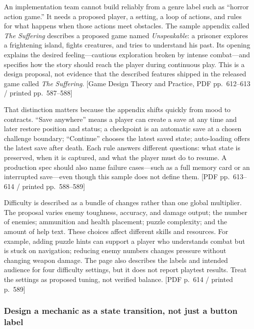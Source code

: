 \hypertarget{05-engine-i-ch009-a-design-document-describes-a-game-that-is-meant-to-exist}{}

An implementation team cannot build reliably from a genre label such as ``horror action game.'' It needs a proposed player, a setting, a loop of actions, and rules for what happens when those actions meet obstacles. The sample appendix called \emph{The Suffering} describes a proposed game named \emph{Unspeakable}: a prisoner explores a frightening island, fights creatures, and tries to understand his past. Its opening explains the desired feeling---cautious exploration broken by intense combat---and specifies how the story should reach the player during continuous play. This is a design proposal, not evidence that the described features shipped in the released game called \emph{The Suffering}. {[}Game Design Theory and Practice, PDF pp.~612--613 / printed pp.~587--588{]}

That distinction matters because the appendix shifts quickly from mood to contracts. ``Save anywhere'' means a player can create a save at any time and later restore position and status; a checkpoint is an automatic save at a chosen challenge boundary; ``Continue'' chooses the latest saved state; auto-loading offers the latest save after death. Each rule answers different questions: what state is preserved, when it is captured, and what the player must do to resume. A production spec should also name failure cases---such as a full memory card or an interrupted save---even though this sample does not define them. {[}PDF pp.~613--614 / printed pp.~588--589{]}

Difficulty is described as a bundle of changes rather than one global multiplier. The proposal varies enemy toughness, accuracy, and damage output; the number of enemies; ammunition and health placement; puzzle complexity; and the amount of help text. These choices affect different skills and resources. For example, adding puzzle hints can support a player who understands combat but is stuck on navigation; reducing enemy numbers changes pressure without changing weapon damage. The page also describes the labels and intended audience for four difficulty settings, but it does not report playtest results. Treat the settings as proposed tuning, not verified balance. {[}PDF p.~614 / printed p.~589{]}

\subsubsection{Design a mechanic as a state transition, not just a button label}\label{05-engine-i-ch009-design-a-mechanic-as-a-state-transition-not-just-a-button-label}


